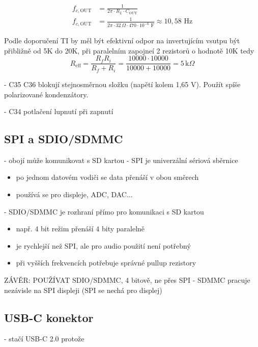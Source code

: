 \documentclass[12pt, a4paper]{article}
\begin{document}
\begin{align*}
f_{c,\text{OUT}} &= \frac{1}{2\pi \cdot R_L \cdot C_{\text{OUT}}} \\
f_{c,\text{OUT}} &= \frac{1}{2\pi \cdot 32\ \Omega \cdot 470 \cdot 10^{-6}\text{ F}} \approx 10{,}58\text{ Hz}
\end{align*}

Podle doporučení TI by měl být efektivní odpor na invertujícím vsutpu být přibližně od 5K do 20K, při paralelním zapojneí 2 rezistorů o hodnotě 10K tedy
\[ R_{\text{eff}} = \frac{R_f R_i}{R_f + R_i} = \frac{10000 \cdot 10000}{10000 + 10000} = 5\,\text{k}\Omega \]

- C35 C36 blokují stejnosměrnou složku (napětí kolem 1,65 V). Použít spíše polarizované kondenzátory.

- C34 potlačení lupnutí při zapnutí

\newpage
\newpage


\subsection{SPI a SDIO/SDMMC}
- obojí může komunikovat s SD kartou
- SPI je univerzální sériová sběrnice
\begin{itemize}
    \item po jednom datovém vodiči se data přenáší v obou směrech
    \item používá se pro displeje, ADC, DAC...
\end{itemize}
- SDIO/SDMMC je rozhraní přímo pro komunikaci s SD kartou
\begin{itemize}
    \item např. 4 bit režim přenáší 4 bity paralelně
    \item je rychlejší než SPI, ale pro audio použití není potřebný
    \item při vyšších frekvencích potřebuje správné pullup rezistory
\end{itemize}

ZÁVĚR: POUŽÍVAT SDIO/SDMMC, 4 bitově, ne přes SPI
- SDMMC pracuje nezávisle na SPI displeji (SPI se nechá pro displej)

\subsection{USB-C konektor}
- stačí USB-C 2.0 protože
\end{document}
